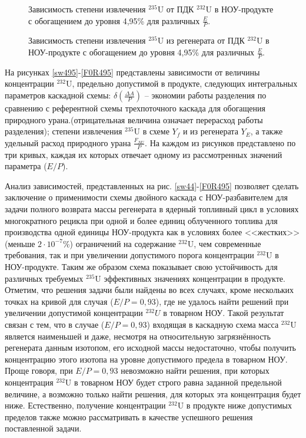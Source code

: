 \begin{figure}[ht]
    \centering
    \begin{minipage}{.5\textwidth}
      \centering
      
      \caption{{Зависимость степени извлечения $^{235}$U от ПДК $^{232}$U в НОУ-продукте с обогащением до уровня 4,95\% для различных $\frac{E}{P}$.{\label{ex495}}}}
    \end{minipage}%
    \begin{minipage}{.5\textwidth}
      \centering
      
      \caption{{Зависимость степени извлечения $^{235}$U из регенерата от ПДК $^{232}$U в НОУ-продукте с обогащением до уровня 4,95\% для различных $\frac{E}{P}$.{\label{exR495}}}}
\end{minipage}
\end{figure}


    
На рисунках \ref{sw495}-\ref{F0R495} представлены зависимости от величины концентрации $^{232}$U, предельно допустимой в продукте, следующих интегральных параметров каскадной схемы: $\delta(\frac{\Delta A}{P})$ -- экономии работы разделения по сравнению с референтной схемы трехпоточного каскада для обогащения природного урана.(отрицательная величина означает перерасход работы разделения); степени извлечения $^{235}$U в схеме $Y_f$ и из регенерата $Y_{E}$, а также удельный расход природного урана $\frac{F_{NU}}{P}$. На каждом из рисунков представлено по три кривых, каждая их которых отвечает одному из рассмотренных значений параметра ($E/P$).

Анализ зависимостей, представленных на рис. \ref{sw44}-\ref{F0R495} позволяет сделать заключение о применимости схемы двойного каскада с НОУ-разбавителем для задачи полного возврата массы регенерата в ядерный топливный цикл в условиях многократного рецикла при одной и более единиц облученного топлива для производства одной единицы НОУ-продукта как в условиях более <<жестких>> (меньше $2\cdot10^{-7}$\%) ограничений на содержание $^{232}$U, чем современные требования, так и при увеличении допустимого порога концентрации $^{232}$U в НОУ-продукте. 
Таким же образом схема показывает свою устойчивость для различных требуемых $^{235}$U эффективных значениях концентрации в продукте. Отметим, что решения задачи были найдены во всех случаях, кроме нескольких точках на кривой для случая ($E/P=0,93$), где не удалось найти решений при увеличении допустимой концентрации $^{232}U$ в товарном НОУ. Такой результат связан с тем, что в случае ($E/P=0,93$) входящая в каскадную схема масса $^{232}$U является наименьшей и даже, несмотря на относительную загрязнённость регенерата данным изотопом, его исходной массы недостаточно, чтобы получить концентрацию этого изотопа на  уровне допустимого предела в товарном НОУ. Проще говоря, при $E/P=0,93$ невозможно найти решения, при которых концентрация $^{232}$U в товарном НОУ будет строго равна заданной предельной величине, а возможно только найти решения, для которых эта концентрация будет ниже. Естественно, получение концентрации $^{232}$U в продукте ниже допустимых пределов также можно рассматривать в качестве успешного решения поставленной задачи.  

